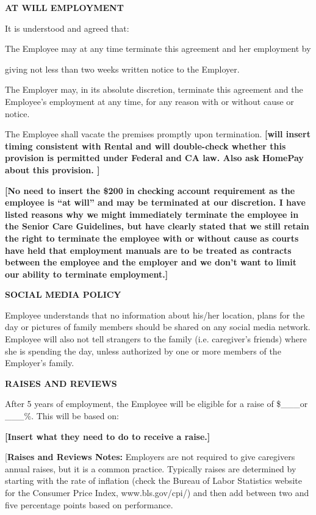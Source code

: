 \documentclass[]{article}
\begin{document}
\textbf{AT WILL EMPLOYMENT}

It is understood and agreed that:

The Employee may at any time terminate this agreement and her employment
by

giving not less than two weeks written notice to the Employer.

The Employer may, in its absolute discretion, terminate this agreement
and the Employee's employment at any time, for any reason with or
without cause or notice.

The Employee shall vacate the premises promptly upon termination.
\textbf{{[}will insert timing consistent with Rental and will
double-check whether this provision is permitted under Federal and CA
law. Also ask HomePay about this provision. {]}}

\textbf{{[}No need to insert the \$200 in checking account requirement
as the employee is ``at will'' and may be terminated at our discretion.
I have listed reasons why we might immediately terminate the employee in
the Senior Care Guidelines, but have clearly stated that we still retain
the right to terminate the employee with or without cause as courts have
held that employment manuals are to be treated as contracts between the
employee and the employer and we don't want to limit our ability to
terminate employment.{]} }

\textbf{SOCIAL MEDIA POLICY}

Employee understands that no information about his/her location, plans
for the day or pictures of family members should be shared on any social
media network. Employee will also not tell strangers to the family (i.e.
caregiver's friends) where she is spending the day, unless authorized by
one or more members of the Employer's family.

\textbf{RAISES AND REVIEWS}

After 5 years of employment, the Employee will be eligible for a raise
of \$\_\_\_or \_\_\_\%. This will be based on:

\textbf{{[}Insert what they need to do to receive a raise.{]}}

{[}\textbf{Raises and Reviews Notes:} Employers are not required to give
caregivers annual raises, but it is a common practice. Typically raises
are determined by starting with the rate of inflation (check the Bureau
of Labor Statistics website for the Consumer Price Index,
www.bls.gov/cpi/) and then add between two and five percentage points
based on performance.
\end{document}
